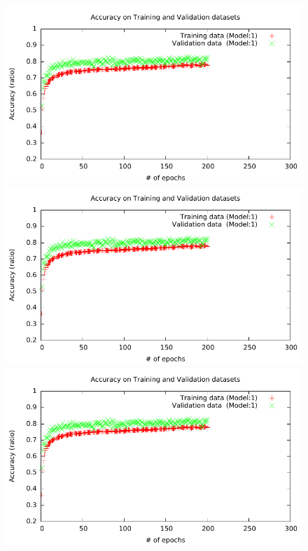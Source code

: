 \documentclass[]{article}
\begin{document}
\begin{figure}
\centering
\begin{minipage}{0.48\textwidth}
\includegraphics[scale=0.55, page=1]{Submissionlogs/LogAcc.pdf}
\end{minipage}
\hfill
\begin{minipage}{0.48\textwidth}
\includegraphics[scale=0.55, page=2]{Submissionlogs/LogAcc.pdf}
\end{minipage}
\hfill
\begin{minipage}{0.48\textwidth}
\includegraphics[scale=0.55, page=3]{Submissionlogs/LogAcc.pdf}

\end{minipage}
\end{figure}
\end{document}
